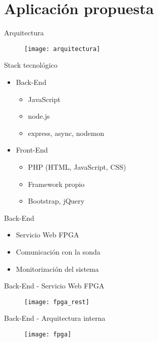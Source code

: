 \section{Aplicación propuesta}

\begin{frame}{Arquitectura}
  \begin{figure}
    \texttt{[image: arquitectura]}
  \end{figure}
\end{frame}

\begin{frame}{Stack tecnológico}
  \begin{itemize}
    \item\alert<+>{Back-End}
    \begin{itemize}
      \item JavaScript
      \item node.js
      \item express, async, nodemon
    \end{itemize}
    \item\alert<+>{Front-End}
    \begin{itemize}
      \item PHP (HTML, JavaScript, CSS)
      \item Framework propio
      \item Bootstrap, jQuery
    \end{itemize}
  \end{itemize}
\end{frame}

\begin{frame}{Back-End}
  \begin{itemize}[<alert@+>]
    \item Servicio Web FPGA
    \item Comunicación con la sonda
    \item Monitorización del sistema
  \end{itemize}
\end{frame}

\begin{frame}{Back-End - Servicio Web FPGA}
  \begin{figure}
    \texttt{[image: fpga\_rest]}
  \end{figure}
\end{frame}

\begin{frame}{Back-End - Arquitectura interna}
  \begin{figure}
    \texttt{[image: fpga]}
  \end{figure}
\end{frame}

